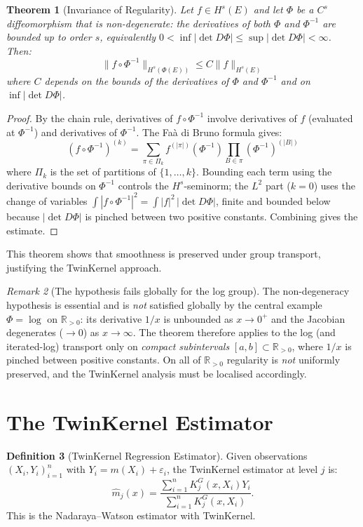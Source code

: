 \documentclass[11pt,twoside,openright]{book}
\theoremstyle{plain}
\newtheorem{theorem}{Theorem}[chapter]
\theoremstyle{definition}
\newtheorem{definition}[theorem]{Definition}
\theoremstyle{remark}
\newtheorem{remark}[theorem]{Remark}
\newcommand{\Rd}{\mathbb{R}}
\newcommand{\norm}[1]{\|#1\|}
\begin{document}
\begin{theorem}[Invariance of Regularity]
\label{thm:regularity-invariance}
Let $f \in H^s(E)$ and let $\Phi$ be a $C^s$ diffeomorphism that is \emph{non-degenerate}: the derivatives of \emph{both} $\Phi$ and $\Phi^{-1}$ are bounded up to order $s$, equivalently $0<\inf|\det D\Phi|\le\sup|\det D\Phi|<\infty$. Then:
\[
\norm{f \circ \Phi^{-1}}_{H^s(\Phi(E))} \leq C \norm{f}_{H^s(E)}
\]
where $C$ depends on the bounds of the derivatives of $\Phi$ and $\Phi^{-1}$ and on $\inf|\det D\Phi|$.
\end{theorem}

\begin{proof}
By the chain rule, derivatives of $f \circ \Phi^{-1}$ involve derivatives of $f$ (evaluated at $\Phi^{-1}$) and derivatives of $\Phi^{-1}$. The Faà di Bruno formula gives:
\[
(f \circ \Phi^{-1})^{(k)} = \sum_{\pi \in \Pi_k} f^{(|\pi|)}(\Phi^{-1}) \prod_{B \in \pi} (\Phi^{-1})^{(|B|)}
\]
where $\Pi_k$ is the set of partitions of $\{1, \ldots, k\}$. Bounding each term using the derivative bounds on $\Phi^{-1}$ controls the $H^s$-seminorm; the $L^2$ part ($k=0$) uses the change of variables $\int|f\circ\Phi^{-1}|^2=\int|f|^2\,|\det D\Phi|$, finite and bounded below because $|\det D\Phi|$ is pinched between two positive constants. Combining gives the estimate.
\end{proof}

This theorem shows that smoothness is preserved under group transport, justifying the TwinKernel approach.

\begin{remark}[The hypothesis fails globally for the log group]
\label{rem:log-noncompact}
The non-degeneracy hypothesis is essential and is \emph{not} satisfied globally by the central example $\Phi=\log$ on $\Rd_{>0}$: its derivative $1/x$ is unbounded as $x\to0^+$ and the Jacobian degenerates ($\to0$) as $x\to\infty$. The theorem therefore applies to the log (and iterated-log) transport only on \emph{compact subintervals} $[a,b]\subset\Rd_{>0}$, where $1/x$ is pinched between positive constants. On all of $\Rd_{>0}$ regularity is \emph{not} uniformly preserved, and the TwinKernel analysis must be localised accordingly.
\end{remark}

\section{The TwinKernel Estimator}

\begin{definition}[TwinKernel Regression Estimator]
Given observations $(X_i, Y_i)_{i=1}^n$ with $Y_i = m(X_i) + \varepsilon_i$, the TwinKernel estimator at level $j$ is:
\begin{equation}
\hat{m}_j(x) = \frac{\sum_{i=1}^n K_j^G(x, X_i) Y_i}{\sum_{i=1}^n K_j^G(x, X_i)}.
\label{eq:twinkernel-estimator}
\end{equation}
This is the Nadaraya--Watson estimator with TwinKernel.
\end{definition}
\end{document}
